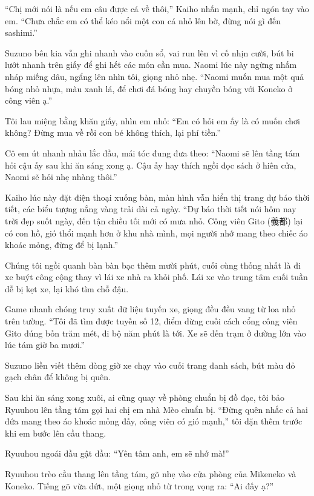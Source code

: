 ﻿\documentclass[../main.tex]{subfiles}
\begin{document}
``Chị mới nói là nếu em câu được cá về thôi,'' Kaiho nhấn mạnh, chỉ ngón tay vào em. ``Chưa chắc em có thể kéo nổi một con cá nhỏ lên bờ, đừng nói gì đến sashimi.''

Suzuno bên kia vẫn ghi nhanh vào cuốn sổ, vai run lên vì cố nhịn cười, bút bi lướt nhanh trên giấy để ghi hết các món cần mua. Naomi lúc này ngừng nhấm nháp miếng dâu, ngẩng lên nhìn tôi, giọng nhỏ nhẹ. ``Naomi muốn mua một quả bóng nhỏ nhựa, màu xanh lá, để chơi đá bóng hay chuyền bóng với Koneko ở công viên ạ.''

Tôi lau miệng bằng khăn giấy, nhìn em nhỏ: ``Em có hỏi em ấy là có muốn chơi không? Đừng mua về rồi con bé không thích, lại phí tiền.''

Cô em út nhanh nhảu lắc đầu, mái tóc đung đưa theo: ``Naomi sẽ lên tầng tám hỏi cậu ấy sau khi ăn sáng xong ạ. Cậu ấy hay thích ngồi đọc sách ở hiên cửa, Naomi sẽ hỏi nhẹ nhàng thôi.''

Kaiho lúc này đặt điện thoại xuống bàn, màn hình vẫn hiển thị trang dự báo thời tiết, các biểu tượng nắng vàng trải dài cả ngày. ``Dự báo thời tiết nói hôm nay trời đẹp suốt ngày, đến tận chiều tối mới có mưa nhỏ. Công viên Gito (義都) lại có con hồ, gió thổi mạnh hơn ở khu nhà mình, mọi người nhớ mang theo chiếc áo khoác mỏng, đừng để bị lạnh.''

Chúng tôi ngồi quanh bàn bàn bạc thêm mười phút, cuối cùng thống nhất là đi xe buýt công cộng thay vì lái xe nhà ra khỏi phố. Lái xe vào trung tâm cuối tuần dễ bị kẹt xe, lại khó tìm chỗ đậu.

Game nhanh chóng truy xuất dữ liệu tuyến xe, giọng đều đều vang từ loa nhỏ trên tường. ``Tôi đã tìm được tuyến số 12, điểm dừng cuối cách cổng công viên Gito đúng bốn trăm mét, đi bộ năm phút là tới. Xe sẽ đến trạm ở đường lớn vào lúc tám giờ ba mươi.''

Suzuno liền viết thêm dòng giờ xe chạy vào cuối trang danh sách, bút màu đỏ gạch chân để không bị quên.

\ct

Sau khi ăn sáng xong xuôi, ai cũng quay về phòng chuẩn bị đồ đạc, tôi bảo Ryuuhou lên tầng tám gọi hai chị em nhà Mèo chuẩn bị. ``Đừng quên nhắc cả hai đứa mang theo áo khoác mỏng đấy, công viên có gió mạnh,'' tôi dặn thêm trước khi em bước lên cầu thang.

Ryuuhou ngoái đầu gật đầu: ``Yên tâm anh, em sẽ nhớ mà!''

\pov{-}


Ryuuhou trèo cầu thang lên tầng tám, gõ nhẹ vào cửa phòng của Mikeneko và Koneko. Tiếng gõ vừa dứt, một giọng nhỏ từ trong vọng ra: ``Ai đấy ạ?''
\end{document}
